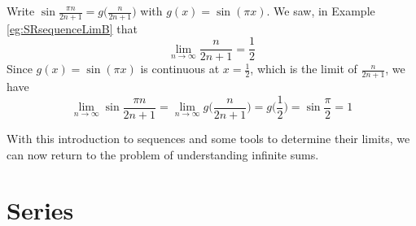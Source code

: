 \begin{eg}
                   \label{eg:SRsequenceLimD}
Write $\sin\frac{\pi n}{2n+1}=g\big(\frac{n}{2n+1}\big)$ with
$g(x)=\sin(\pi x)$. We saw, in Example \ref{eg:SRsequenceLimB} that
\begin{equation*}
\lim_{n\rightarrow\infty}\frac{n}{2n+1} = \frac{1}{2}
\end{equation*}
Since $g(x) = \sin (\pi x)$ is continuous at $x=\frac{1}{2}$, which
is the limit of $\frac{n}{2n+1}$, we have
\begin{equation*}
\lim_{n\rightarrow\infty}\sin\frac{\pi n}{2n+1}
=\lim_{n\rightarrow\infty}g\Big(\frac{n}{2n+1}\Big)
=g\Big(\frac{1}{2}\Big)
=\sin\frac{\pi}{2}
=1
\end{equation*}
\end{eg}

With this introduction to sequences and some tools to determine their limits,
we can now return to the problem of understanding infinite sums.

\section{Series}

